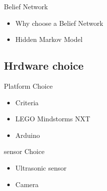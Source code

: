 \begin{frame}{Belief Network}
\begin{itemize}
 \item Why choose a Belief Network
 \item Hidden Markov Model
\end{itemize}
\end{frame}

\subsection{Hrdware choice}
\begin{frame}{Platform Choice}
\begin{itemize}
 \item Criteria
 \item LEGO Mindstorms NXT
 \item Arduino
\end{itemize}
\end{frame}

\begin{frame}{sensor Choice}
\begin{itemize}
 \item Ultrasonic sensor
 \item Camera
\end{itemize}
\end{frame}
